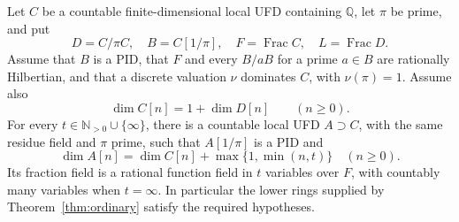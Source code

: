 \documentclass[10pt,a4paper]{amsart}
\begin{document}
\begin{theorem}\label{thm:relative}
Let \(C\) be a countable finite-dimensional local UFD containing
\(\mathbb Q\), let \(\pi\) be prime, and put
\[
 D=C/\pi C,\quad B=C[1/\pi],\quad
 F=\operatorname{Frac}C,\quad L=\operatorname{Frac}D.
\]
Assume that \(B\) is a PID, that \(F\) and every \(B/aB\)
for a prime \(a\in B\) are rationally Hilbertian, and that a
discrete valuation \(\nu\) dominates \(C\), with
\(\nu(\pi)=1\).  Assume also
\begin{equation}\label{eq:relative-lower-profile}
\dim C[n]=1+\dim D[n]\qquad(n\ge0).
\end{equation}
For every \(t\in\mathbb N_{>0}\cup\{\infty\}\), there is
a countable local UFD \(A\supset C\), with the same residue
field and \(\pi\) prime, such that \(A[1/\pi]\) is a PID and
\begin{equation}\label{eq:relative-profile}
\dim A[n]=\dim C[n]+\max\{1,\min(n,t)\}\quad(n\ge0).
\end{equation}
Its fraction field is a rational function field in \(t\)
variables over \(F\), with countably many variables when
\(t=\infty\).  In particular the lower rings supplied by
Theorem~\ref{thm:ordinary} satisfy the required hypotheses.
\end{theorem}
\end{document}
